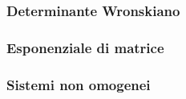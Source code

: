 \subsubsection{Determinante Wronskiano}


\subsubsection{Esponenziale di matrice}


\subsubsection{Sistemi non omogenei}